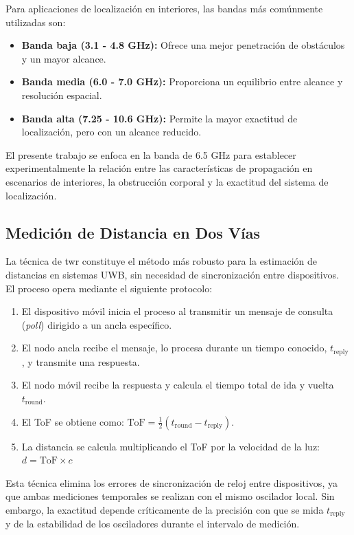 Para aplicaciones de localización en interiores, las bandas más comúnmente utilizadas son:
\begin{itemize}
    \item \textbf{Banda baja (3.1 - 4.8 GHz):} Ofrece una mejor penetración de obstáculos y un mayor alcance.
    \item \textbf{Banda media (6.0 - 7.0 GHz):} Proporciona un equilibrio entre alcance y resolución espacial.
    \item \textbf{Banda alta (7.25 - 10.6 GHz):} Permite la mayor exactitud de localización, pero con un alcance reducido.
\end{itemize}

El presente trabajo se enfoca en la banda de 6.5 GHz para establecer experimentalmente la relación entre las características de propagación en escenarios de interiores, la obstrucción corporal y la exactitud del sistema de localización.

\subsection{Medición de Distancia en Dos Vías}

La técnica de \gls{twr} constituye el método más robusto para la estimación de distancias en sistemas UWB, sin necesidad  de sincronización entre dispositivos. El proceso opera mediante el siguiente protocolo:

\begin{enumerate}
    \item El dispositivo móvil inicia el proceso al transmitir un mensaje de consulta (\textit{poll}) dirigido a un ancla específico.
    \item El nodo ancla recibe el mensaje, lo procesa durante un tiempo conocido, $t_{\text{reply}}$, y transmite una respuesta.
    \item El nodo móvil recibe la respuesta y calcula el tiempo total de ida y vuelta $t_{\text{round}}$.
    \item El ToF se obtiene como: $\text{ToF} = \frac{1}{2}(t_{\text{round}} - t_{\text{reply}})$.
    \item La distancia se calcula multiplicando el ToF por la velocidad de la luz: $d = \text{ToF} \times c$
\end{enumerate}

Esta técnica elimina los errores de sincronización de reloj entre dispositivos, ya que ambas mediciones temporales se realizan con el mismo oscilador local. Sin embargo, la exactitud depende críticamente de la precisión con que se mida $t_{\text{reply}}$ y de la estabilidad de los osciladores durante el intervalo de medición.

